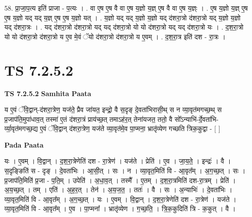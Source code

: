 \documentclass[17pt]{extarticle}
\begin{document}
58. प्रा॒जा॒प॒त्य इति॑ प्राजा - प॒त्यः । . वा ए॒ष ए॒ष वै वा ए॒ष य॒ज्ञो य॒ज्ञ् ए॒ष वै वा ए॒ष य॒ज्ञ्ः । . ए॒ष य॒ज्ञो य॒ज्ञ् ए॒ष ए॒ष य॒ज्ञो यद् यद् य॒ज्ञ् ए॒ष ए॒ष य॒ज्ञो यत् । . य॒ज्ञो यद् यद् य॒ज्ञो य॒ज्ञो यद् द॑शरा॒त्रो द॑शरा॒त्रो यद् य॒ज्ञो य॒ज्ञो यद् द॑शरा॒त्रः । . यद् द॑शरा॒त्रो द॑शरा॒त्रो यद् यद् द॑शरा॒त्रो यो यो द॑शरा॒त्रो यद् यद् द॑शरा॒त्रो यः । . द॒श॒रा॒त्रो यो यो द॑शरा॒त्रो द॑शरा॒त्रो य ए॒व मे॒वं ॅयो द॑शरा॒त्रो द॑शरा॒त्रो य ए॒वम् । . द॒श॒रा॒त्र इति॑ दश - रा॒त्रः । \newline
\pagebreak
{}

\section{ TS 7.2.5.2 }

\textbf{TS 7.2.5.2 } \newline
\textbf{Samhita Paata} \newline

य ए॒वं ॅवि॒द्वान्-द॑शरा॒त्रेण॒ यज॑ते॒ प्रैव जा॑यत॒ इन्द्रो॒ वै स॒दृङ् दे॒वता॑भिरासी॒थ् स न व्या॒वृत॑मगच्छ॒थ् स प्र॒जाप॑ति॒मुपा॑धाव॒त् तस्मा॑ ए॒तं द॑शरा॒त्रं प्राय॑च्छ॒त् तमाऽह॑र॒त् तेना॑यजत॒ ततो॒ वै सो᳚ऽन्याभि॑-र्दे॒वता॑भि-र्व्या॒वृत॑मगच्छ॒द्य ए॒वं ॅवि॒द्वान् द॑शरा॒त्रेण॒ यज॑ते व्या॒वृत॑मे॒व पा॒प्मना॒ भ्रातृ॑व्येण गच्छति त्रिक॒कुद्वा - [  ] \newline

\textbf{Pada Paata} \newline

यः । ए॒वम् । वि॒द्वान् । द॒श॒रा॒त्रेणेति॑ दश - रा॒त्रेण॑ । यज॑ते । प्रेति॑ । ए॒व । जा॒य॒ते॒ । इन्द्रः॑ । वै । स॒दृङ्ङिति॑ स - दृङ् । दे॒वता॑भिः । आ॒सी॒त् । सः । न । व्या॒वृत॒मिति॑ वि - आ॒वृत᳚म् । अ॒ग॒च्छ॒त् । सः । प्र॒जाप॑ति॒मिति॑ प्र॒जा - प॒ति॒म् । उपेति॑ । अ॒धा॒व॒त् । तस्मै᳚ । ए॒तम् । द॒श॒रा॒त्रमिति॑ दश-रा॒त्रम् । प्रेति॑ । अ॒य॒च्छ॒त् । तम् । एति॑ । अ॒ह॒र॒त् । तेन॑ । अ॒य॒ज॒त॒ । ततः॑ । वै । सः । अ॒न्याभिः॑ । दे॒वता॑भिः । व्या॒वृत॒मिति॑ वि - आ॒वृत᳚म् । अ॒ग॒च्छ॒त् । यः । ए॒वम् । वि॒द्वान् । द॒श॒रा॒त्रेणेति॑ दश - रा॒त्रेण॑ । यज॑ते । व्या॒वृत॒मिति॑ वि - आ॒वृत᳚म् । ए॒व । पा॒प्मना᳚ । भ्रातृ॑व्येण । ग॒च्छ॒ति॒ । त्रि॒क॒कुदिति॑ त्रि - क॒कुत् । वै ।  \newline
\end{document}
